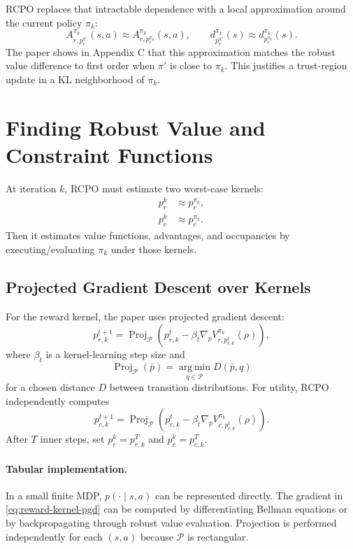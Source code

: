 \documentclass[11pt]{article}
\newcommand{\Pset}{\mathcal P}
\newcommand{\Proj}{\operatorname{Proj}}
\newcommand{\argmin}{\operatorname*{arg\,min}}
\begin{document}
RCPO replaces that intractable dependence with a local approximation around the current policy $\pi_k$:
\begin{equation}
    A^{\pi_k}_{r,p_r^{\pi'}}(s,a)\approx A^{\pi_k}_{r,p_r^{\pi_k}}(s,a),
    \qquad
    d_{p_r^{\pi'}}^{\pi_k}(s)\approx d_{p_r^{\pi_k}}^{\pi_k}(s).
\end{equation}
The paper shows in Appendix C that this approximation matches the robust value difference to first order when $\pi'$ is close to $\pi_k$.  This justifies a trust-region update in a KL neighborhood of $\pi_k$.

\section{Finding Robust Value and Constraint Functions}
At iteration $k$, RCPO must estimate two worst-case kernels:
\begin{align}
    p_r^k &\approx p_r^{\pi_k},\\
    p_c^k &\approx p_c^{\pi_k}.
\end{align}
Then it estimates value functions, advantages, and occupancies by executing/evaluating $\pi_k$ under those kernels.

\subsection{Projected Gradient Descent over Kernels}
For the reward kernel, the paper uses projected gradient descent:
\begin{equation}
    p_{r,k}^{t+1}
    =\Proj_{\Pset}\!\left(p_{r,k}^{t}-\beta_t\nabla_p V^{\pi_k}_{r,p_{r,k}^{t}}(\rho)\right),
    \label{eq:reward-kernel-pgd}
\end{equation}
where $\beta_t$ is a kernel-learning step size and
\begin{equation}
    \Proj_{\Pset}(\bar p)
    =\argmin_{q\in\Pset}D(\bar p,q)
\end{equation}
for a chosen distance $D$ between transition distributions.  For utility, RCPO independently computes
\begin{equation}
    p_{c,k}^{t+1}
    =\Proj_{\Pset}\!\left(p_{c,k}^{t}-\beta_t\nabla_p V^{\pi_k}_{c,p_{c,k}^{t}}(\rho)\right).
    \label{eq:utility-kernel-pgd}
\end{equation}
After $T$ inner steps, set $p_r^k=p_{r,k}^T$ and $p_c^k=p_{c,k}^T$.

\paragraph{Tabular implementation.}
In a small finite MDP, $p(\cdot\mid s,a)$ can be represented directly.  The gradient in \eqref{eq:reward-kernel-pgd} can be computed by differentiating Bellman equations or by backpropagating through robust value evaluation.  Projection is performed independently for each $(s,a)$ because $\Pset$ is rectangular.
\end{document}
